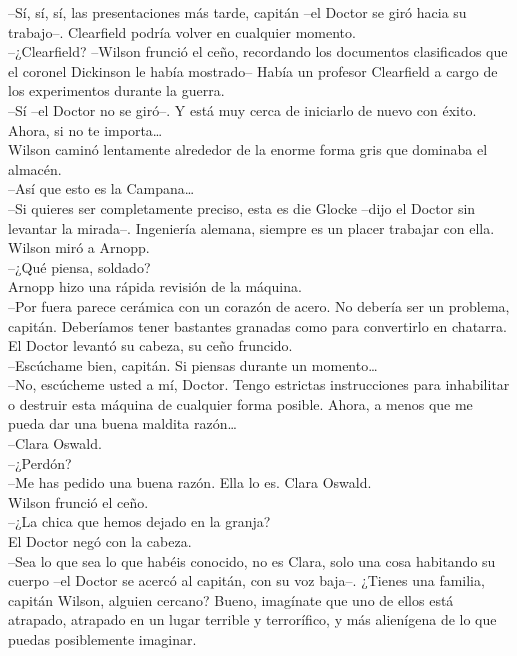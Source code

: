 --Sí, sí, sí, las presentaciones más tarde, capitán --el Doctor se giró
hacia su trabajo--. Clearfield podría volver en cualquier momento.\\
--¿Clearfield? --Wilson frunció el ceño, recordando los documentos
clasificados que el coronel Dickinson le había mostrado-- Había un
profesor Clearfield a cargo de los experimentos durante la guerra.\\
--Sí --el Doctor no se giró--. Y está muy cerca de iniciarlo de nuevo
con éxito. Ahora, si no te importa\ldots{}\\
Wilson caminó lentamente alrededor de la enorme forma gris que dominaba
el almacén.\\
--Así que esto es la Campana\ldots{}\\
--Si quieres ser completamente preciso, esta es die Glocke --dijo el
Doctor sin levantar la mirada--. Ingeniería alemana, siempre es un
placer trabajar con ella.\\
Wilson miró a Arnopp.\\
--¿Qué piensa, soldado?\\
Arnopp hizo una rápida revisión de la máquina.\\
--Por fuera parece cerámica con un corazón de acero. No debería ser un
problema, capitán. Deberíamos tener bastantes granadas como para
convertirlo en chatarra.\\
El Doctor levantó su cabeza, su ceño fruncido.\\
--Escúchame bien, capitán. Si piensas durante un momento\ldots{}\\
--No, escúcheme usted a mí, Doctor. Tengo estrictas instrucciones para
inhabilitar o destruir esta máquina de cualquier forma posible. Ahora, a
menos que me pueda dar una buena maldita razón\ldots{}\\
--Clara Oswald.\\
--¿Perdón?\\
--Me has pedido una buena razón. Ella lo es. Clara Oswald.\\
Wilson frunció el ceño.\\
--¿La chica que hemos dejado en la granja?\\
El Doctor negó con la cabeza.\\
--Sea lo que sea lo que habéis conocido, no es Clara, solo una cosa
habitando su cuerpo --el Doctor se acercó al capitán, con su voz baja--.
¿Tienes una familia, capitán Wilson, alguien cercano? Bueno, imagínate
que uno de ellos está atrapado, atrapado en un lugar terrible y
terrorífico, y más alienígena de lo que puedas posiblemente imaginar.

